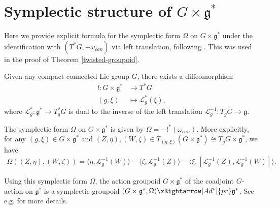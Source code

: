 \documentclass{amsart}
\numberwithin{equation}{section}
\begin{document}
\appendix

\section{Symplectic structure of $G \times \mathfrak{g}^*$} \label{appendix:symplecticform}
Here we provide explicit formula for the symplectic form $\Omega$ on $G \times \mathfrak{g}^*$ under the identification with $(T^*G, -\omega_{can})$ via left translation, following \cite[Example 14.7]{CFM}. This was used in the proof of Theorem \ref{twisted-groupoid}. 

Given any compact connected Lie group $G$, there exists a diffeomorphism 
\begin{align*}
l: G \times \mathfrak{g}^* &\rightarrow T^*G\\
(g, \xi) &\mapsto \mathcal{L}^*_g(\xi),
\end{align*}
where $\mathcal{L}^*_g: \mathfrak{g}^* \rightarrow T^*_gG$ is dual to the inverse of the left translation $\mathcal{L}^{-1}_{g}: T_gG\rightarrow \mathfrak{g}$.

The symplectic form $\Omega$ on $G \times \mathfrak{g}^*$ is given by $\Omega = -l^*(\omega_{can})$. More explicitly, for any $(g, \xi) \in G \times \mathfrak{g}^*$ and $(Z, \eta), (W, \zeta) \in T_{(g, \xi)}(G \times \mathfrak{g}^*) \cong T_gG \times \mathfrak{g}^*$, we have
\begin{align}\label{symplecticform}
\Omega((Z, \eta), (W, \zeta)) = \langle \eta, \mathcal{L}^{-1}_{g}(W) \rangle - \langle \zeta, \mathcal{L}^{-1}_{g}(Z) \rangle - \langle \xi, [\mathcal{L}^{-1}_{g}(Z), \mathcal{L}^{-1}_{g}(W)] \rangle.
\end{align}

Using this symplectic form $\Omega$, the action groupoid $G \times \mathfrak{g}^*$ of the coadjoint $G$-action on $\mathfrak{g}^*$ is a symplectic groupoid $(G \times \mathfrak{g}^*, \Omega) \xRightarrow[Ad^*]{pr} \mathfrak{g}^*$. See e.g. \cite[Example 14.7]{CFM} for more details.
\end{document}
